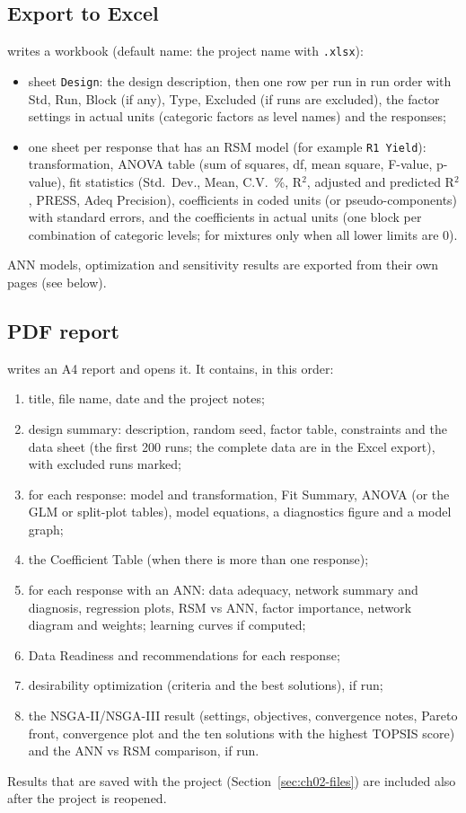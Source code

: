 \subsection{Export to Excel}
\label{sec:ch02-excel}
 writes a workbook (default name: the project name with
\texttt{.xlsx}):
\begin{itemize}
  \item sheet \texttt{Design}: the design description, then one row per run in run order with Std, Run, Block
        (if any), Type, Excluded (if runs are excluded), the factor settings in actual units (categoric factors as
        level names) and the responses;
  \item one sheet per response that has an RSM model (for example \texttt{R1 Yield}): transformation, ANOVA table
        (sum of squares, df, mean square, F-value, p-value), fit statistics (Std.\ Dev., Mean, C.V.\ \%, R$^2$,
        adjusted and predicted R$^2$, PRESS, Adeq Precision), coefficients in coded units (or pseudo-components)
        with standard errors, and the coefficients in actual units (one block per combination of categoric
        levels; for mixtures only when all lower limits are 0).
\end{itemize}
ANN models, optimization and sensitivity results are exported from their own pages (see below).

\subsection{PDF report}
\label{sec:ch02-pdf}
 writes an A4 report and opens it. It contains, in this order:
\begin{enumerate}
  \item title, file name, date and the project notes;
  \item design summary: description, random seed, factor table, constraints and the data sheet (the first 200
        runs; the complete data are in the Excel export), with excluded runs marked;
  \item for each response: model and transformation, Fit Summary, ANOVA (or the GLM or split-plot tables), model
        equations, a diagnostics figure and a model graph;
  \item the Coefficient Table (when there is more than one response);
  \item for each response with an ANN: data adequacy, network summary and diagnosis, regression plots, RSM vs ANN,
        factor importance, network diagram and weights; learning curves if computed;
  \item Data Readiness and recommendations for each response;
  \item desirability optimization (criteria and the best solutions), if run;
  \item the NSGA-II/NSGA-III result (settings, objectives, convergence notes, Pareto front, convergence plot and the
        ten solutions with the highest TOPSIS score) and the ANN vs RSM comparison, if run.
\end{enumerate}
Results that are saved with the project (Section~\ref{sec:ch02-files}) are included also after the project is
reopened.

